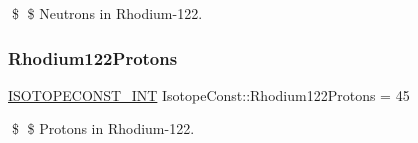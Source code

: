 \$ \$ Neutrons in Rhodium-\/122. \mbox{\label{group___isotope_const-_rhodium-_rh122_gad749a1d50dc77be6f0e285d9acf1f160}} 
\subsubsection{\texorpdfstring{Rhodium122\+Protons}{Rhodium122Protons}}
{\footnotesize\ttfamily \mbox{\hyperlink{group___isotope_const-_macros_ga5f18360b3e99483a35c32d789e62621c}{I\+S\+O\+T\+O\+P\+E\+C\+O\+N\+S\+T\+\_\+\+I\+NT}} Isotope\+Const\+::\+Rhodium122\+Protons = 45}

\$ \$ Protons in Rhodium-\/122. 